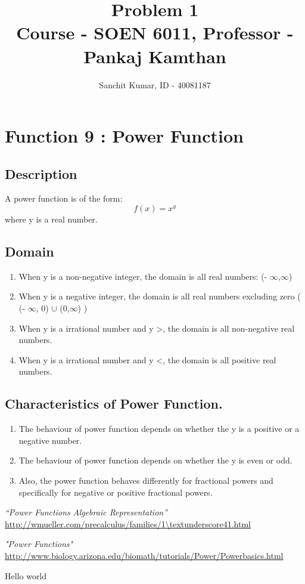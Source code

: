 \documentclass[a4paper,12pt]{article}
\title{Problem 1\\
		\large Course - SOEN 6011, Professor - Pankaj Kamthan}
\author{Sanchit Kumar, ID - 40081187}
\begin{document}
\maketitle %

\section{\large Function 9 : Power Function}

\subsection{Description}
A power function is of the form:
\begin{equation} \label{Power_func}
	f(x) = x^y
\end{equation}
where y is a real number.


\subsection{Domain}
\begin{enumerate}
\item When y is a non-negative integer, the domain is all real numbers:  (- $\infty$,$\infty$)

\item When y is a negative integer, the domain is all real numbers excluding zero ( (- $\infty$, 0) $\cup$ (0,$\infty$) )

\item When y is a irrational number and y \textgreater {}, the domain is all non-negative real numbers.

\item When y is a irrational number and y \textless {}, the domain is all positive real numbers. 
\end{enumerate}


\subsection{Characteristics of Power Function.}
\begin{enumerate}
\item The behaviour of power function depends on whether the y is a positive or a negative number.
\item The behaviour of power function depends on whether the y is even or odd.
\item Also, the power function behaves differently for fractional powers and specifically for negative or positive fractional powers.
\end{enumerate}

\begin{thebibliography}{9}
	
	 \emph{“Power Functions Algebraic Representation”} \url{http://wmueller.com/precalculus/families/1\textunderscore41.html} 
	
	 \emph{"Power Functions"} \url{http://www.biology.arizona.edu/biomath/tutorials/Power/Powerbasics.html}
	
\end{thebibliography}

\newpage
Hello world
\end{document}
